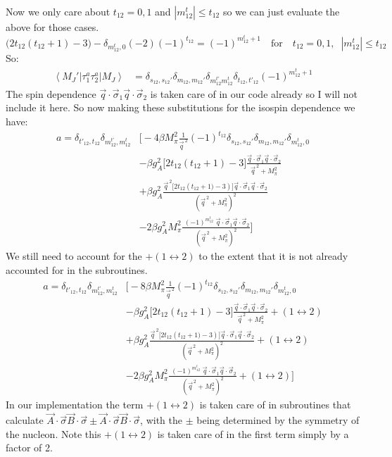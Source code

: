 \documentclass[11pt]{article}
\newcommand{\br}[1]{\left\langle #1 \right |}
\newcommand{\kt}[1]{\left| #1 \right \rangle}
\newcommand{\ot}{_{12}}
\newcommand{\tot}{t_{12}}
\newcommand{\totp}{t'_{12}}
\newcommand{\sq}{^{\,2}}
\begin{document}
Now we only care about $t_{12}=0,1$ and $|m^t\ot|\leq t\ot$ so we can just evaluate the above for those cases.
\begin{equation}
    \big( 2 t_{12} \left( \tot+1 \right) -3\big) - \delta_{m_{12}^t ,0} \left( -2 \right) (-1)^{t_{12}}= (-1)^{m\ot^t+1}\quad
    \text{for}\quad t_{12}=0,1,\;\;|m^t\ot|\leq t\ot
\end{equation}
So:
\begin{align}
    \br{M_J'}\tau_1^a \tau_2^a \kt{M_J}&= \delta_{s\ot,s\ot'}\delta_{m\ot,m\ot'}\delta_{m_{12}^{t'}{m_{12}^{t}}} \delta_{\tot,\totp} (-1)^{m^t\ot+1}
\end{align}
The spin dependence $\vec{q}\cdot \vec{\sigma}_1 \vec{q}\cdot \vec{\sigma}_2$ is taken care of in our code already so I will not include it here. So now making these substitutions for the isospin dependence we have:
\begin{align}
    a=\delta_{t'_{12},t_{12}} \delta_{m^{t'}\ot, m^t\ot}&\Bigg[ -4 \beta M_\pi^2 
        \frac{1}{\vec{q}\sq}(-1)^{t\ot}\delta_{s\ot,s\ot'}\delta_{m_{12},m\ot'}\delta_{m^t_{12},0}\nonumber\\
     &-\beta g_A^2 \Big[ 2 t\ot (t\ot+1)-3 \Big] \frac{\vec{q} \cdot \vec{\sigma}_{1} \vec{q} \cdot
     \vec{\sigma}_{2}}{\vec{q}\sq+M_\pi^2}\nonumber\\
          &+\beta g_A^2\frac{\vec{q}\sq \Big[2 t\ot \left( t\ot+1)-3 \right) \Big]\vec{q} \cdot \vec{\sigma}_{1} \vec{q}\cdot \vec{\sigma}_{2}}{\left(\vec{q}\sq+M_\pi^2\right)^2}\nonumber\\
          &-2\beta g_A^2 M_\pi^2\frac{\;(-1)^{m^t_{12}}\; \vec{q} \cdot \vec{\sigma}_{1} \vec{q}\cdot \vec{\sigma}_{2}}{\left(\vec{q}\sq+M_\pi^2\right)^2}\Bigg]
\end{align}
We still need to account for the $+(1\leftrightarrow2)$ to the extent that it is not already accounted for in the subroutines.
\begin{align}
    a=\delta_{t'_{12},t_{12}} \delta_{m^{t'}\ot, m^t\ot}&\Bigg[ -8 \beta M_\pi^2
        \frac{1}{\vec{q}\sq}(-1)^{t\ot}\delta_{s\ot,s\ot'}\delta_{m_{12},m\ot'}\delta_{m^t_{12},0}\nonumber\\
     &-\beta g_A^2 \Big[ 2 t\ot (t\ot+1)-3 \Big] \frac{\vec{q} \cdot \vec{\sigma}_{1} \vec{q} \cdot
     \vec{\sigma}_{2}}{\vec{q}\sq+M_\pi^2}+(1\leftrightarrow2)\nonumber\\
          &+\beta g_A^2\frac{\vec{q}\sq \Big[2 t\ot \left( t\ot+1)-3 \right) \Big]\vec{q} \cdot \vec{\sigma}_{1} \vec{q}\cdot \vec{\sigma}_{2}}{\left(\vec{q}\sq+M_\pi^2\right)^2}+(1\leftrightarrow2)\nonumber\\
          &-2\beta g_A^2 M_\pi^2\frac{\;(-1)^{m^t_{12}}\; \vec{q} \cdot \vec{\sigma}_{1} \vec{q}\cdot \vec{\sigma}_{2}}{\left(\vec{q}\sq+M_\pi^2\right)^2}+(1\leftrightarrow2)\Bigg]
\end{align}
In our implementation the term $+(1\leftrightarrow2)$ is taken care of in subroutines that calculate $\vec{A} \cdot \vec{\sigma}\vec{B} \cdot \vec{\sigma}\pm\vec{A} \cdot \vec{\sigma}\vec{B} \cdot \vec{\sigma}$, with the $\pm$ being determined by the symmetry of the nucleon.
Note this $+(1\leftrightarrow2)$ is taken care of in the first term simply by a factor of 2.
\end{document}
